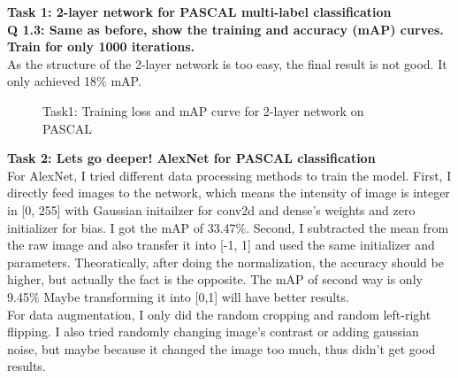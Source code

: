 \documentclass[12pt]{report}
\begin{document}
\begin{outline}
\item \textbf{Task 1: 2-layer network for PASCAL multi-label classification}\\

\textbf{Q 1.3: Same as before, show the training and accuracy (mAP) curves. Train for only 1000 iterations.}\\
As the structure of the 2-layer network is too easy, the final result is not good. It only achieved 18\% mAP.\\

\begin{figure}[!h]
  \centering
  \caption{Task1: Training loss and mAP curve for 2-layer network on PASCAL}
\label{fig:short}
\end{figure}


\item \textbf{Task 2: Lets go deeper! AlexNet for PASCAL classification}\\

For AlexNet, I tried different data processing methods to train the model. First, I directly feed images to the network, which means the intensity of image is integer in [0, 255] with Gaussian initailzer for conv2d and dense's weights and zero initializer for bias. I got the mAP of 33.47\%. Second, I subtracted the mean from the raw image and also transfer it into [-1, 1] and used the same initializer and parameters. Theoratically, after doing the normalization, the accuracy should be higher, but actually the fact is the opposite. The mAP of second way is only 9.45\% Maybe transforming it into [0,1] will have better results. \\
For data augmentation, I only did the random cropping and random left-right flipping. I also tried randomly changing image's contrast or adding gaussian noise, but maybe because it changed the image too much, thus didn't get good results.\\


\end{outline}
\end{document}
